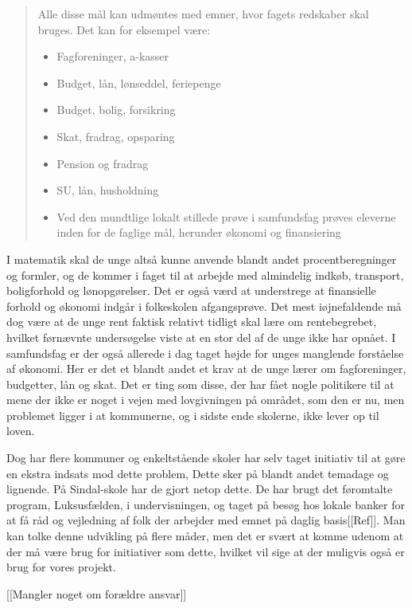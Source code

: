 \begin{quotation}
\begin{description}
\item{Alle disse mål kan udmøntes med emner, hvor fagets redskaber skal bruges. Det kan for eksempel være:}
\noindent \begin{itemize}
\item{Fagforeninger, a-kasser}
\item{Budget, lån, lønseddel, feriepenge}
\item{Budget, bolig, forsikring}
\item{Skat, fradrag, opsparing}
\item{Pension og fradrag}
\item{SU, lån, husholdning}
\item{Ved den mundtlige lokalt stillede prøve i samfundsfag prøves eleverne inden for de faglige mål, herunder økonomi og finansiering}
\end{itemize}
\end{description}
\end{quotation}

I matematik skal de unge altså kunne anvende blandt andet procentberegninger og formler, og de kommer i faget til at arbejde med almindelig indkøb, transport, boligforhold og lønopgørelser. Det er også værd at understrege at finansielle forhold og økonomi indgår i folkeskolen afgangsprøve. Det mest iøjnefaldende må dog være at de unge rent faktisk relativt tidligt skal lære om rentebegrebet, hvilket førnævnte undersøgelse viste at en stor del af de unge ikke har opnået. I samfundsfag er der også allerede i dag taget højde for unges manglende forståelse af økonomi. Her er det et blandt andet et krav at de unge lærer om fagforeninger, budgetter, lån og skat. Det er ting som disse, der har fået nogle politikere til at mene der ikke er noget i vejen med lovgivningen på området, som den er nu, men problemet ligger i at kommunerne, og i sidste ende skolerne, ikke lever op til loven\cite{BusinessDK3}.

Dog har flere kommuner og enkeltstående skoler har selv taget initiativ til at gøre en ekstra indsats mod dette problem, Dette sker på blandt andet temadage og lignende. På Sindal-skole har de gjort netop dette. De har brugt det føromtalte program, Luksusfælden, i undervisningen, og taget på besøg hos lokale banker for at få råd og vejledning af folk der arbejder med emnet på daglig basis[[Ref]]. Man kan tolke denne udvikling på flere måder, men det er svært at komme udenom at der må være brug for initiativer som dette, hvilket vil sige at der muligvis også er brug for vores projekt.

[[Mangler noget om forældre ansvar]]




 